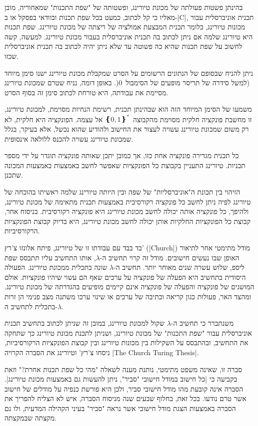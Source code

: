בהינתן פשטות פעולתה של מכונת טיורינג, ופשטותה של "שפת התכנות" שמאחוריה, מובן
מאליו כי קל לכתוב, כמעט בכל שפת תכנות ובוודאי בפסקל או ב-\E|C|, תכנית
אוניברסלית עבור מכונות טיורינג, כלומר תכנית המבצעת אמולציה של ריצתה של מכונת
טיורינג. שפת תכנות היא טיורינג שלמה אם ניתן לכתוב בה תכנית אוניברסלית בעבור
מכונת טיורינג. למעשה, קשה לחשוב על שפת תכנות שהיא כה פשוטה עד שלא ניתן יהיה
לכתוב בה תכנית אוניברסלית שכזו.

ניתן להניח שבסופם של הנתונים הרשומים על הסרט שמקבלת מכונת טיורינג ישנו סימן
מיוחד (למשל סידרה של תריסר מופעים של הסימבול~$0$(. באופן דומה, נניח שטרם שמכונת
טיורינג מסיימת את עבודתה, היא טורחת לכתוב סימן זה בסוף הסרט.

משמעו של הסימן המיוחד הזה הוא שבהינתן תכנית, רשימת הנחיות מסוימת, למכונת
טיורינג, זו מחשבת פונקציה חלקית מסוימת מהקבוצה~$❴0,1❵^*$ אל עצמה. הפונקציה
היא חלקית, לא רק משום שמכונת טיורינג עשויה לעצור את החישוב ולהודיע שהוא נכשל,
אלא בעיקר, בגלל שמכונת טיורינג עשויה להכנס ללולאה אינסופית.

כל תכנית מגדירה פונקציה אחת כזו, אך כמובן יתכן שאותה פונקציה תוגדר על ידי מספר
תכניות. טיורינג התעניין בקבוצת כל הפונקציות שאפשר לחשב באמצעות באמצעות המכונה
שתכנן.

הזיהוי בין תכונת ה"אוניברסליות" של שפה ובין היותה טיורינג שלמה ראשיתו בהוכחה של
טיורינג לפיה ניתן לחשב כל פונקציה רקורסיבית באמצעות תכנית מתאימה של מכונת
טיורינג, ולהיפך, כל פונקציה אותה יכולה לחשב מכונת טיורינג היא פונקציה
רקורסיבית. בניסוח אחר, קבוצת כל הפונקציות החלקיות אותן יכולה לחשב מכונת
טיורינג, היא בדיוק קבוצת הפונקציות הרקורסיביות.

בד בבד עם עבודתו זו של טיורינג, פיתח אלונזו צ'רץ' (\E|Church|) מודל
מתימטי אחר לתיאור האופן שבו נעשים חישובים. מודל זה קרוי תחשיב ה-$λ$, אותו
התחשיב עליו תתבסס שפת ליספ, שלוש עשרה שנים מאוחר יותר. תחשיב ה-$λ$ שונה בתכלית
ממכונת טיורינג. הפעולה היסודית בתחשיב היא הפעלה של פונקציה על ערכים שאף הם עשוי
שיהיו פונקציות. אולם המושגים של פונקציה והפעלה של פונקציה אינם קיימים מופיעים
בהגדרתה של מכונת טיורינג. ומהצד האר, פעולות כגון קריאה וכתיבה של ערכים או שינוי
ערכו משתנה מצב פנימי הן זרות בתכלית לתחשיב ה-$λ$.

משנתברר כי תחשיב ה-$λ$ שקול למכונת טיורינג, במובן זה שניתן לכתוב בתחשיב תכנית
אוניברסלית עבור "שפת התכנות" של מכונת טיורינג, ושניתן לתכנת מכונת טיורינג כך
שתחקה את התחשיב, ובהתבסס על השקילות בין מכונות טיורינג ובין קבוצת הפונקציות
הרקורסיביות, ניסחו צ'רץ' וטיורינג את הסברה הקרויה \E|The Church Turing Thesis|.

סברה זו, שאינה משפט מתימטי, נותנת מענה לשאלה "מהי כל שפת תכנות אחרת?" וזאת
בקביעה כי \ע|כל חישוב במודל חישובי "סביר", ניתן להעשות גם באמצעות מכונת
טיורינג|. הסברה אינה קובעת מהו מודל חישובי סביר, ולכן היא פורשת כנפיה על
מודלים של חישוב אשר טרם נודעו. בכל זאת, בחלוף שבעים שנה מניסוח הסברה,
איש לא הצליח להפריך את הסברה באמצעות הצגת מודל חישובי אשר נראה "סביר"
בעיני הקהילה המדעית, ולו גם מקצתה שבמקצתה.

